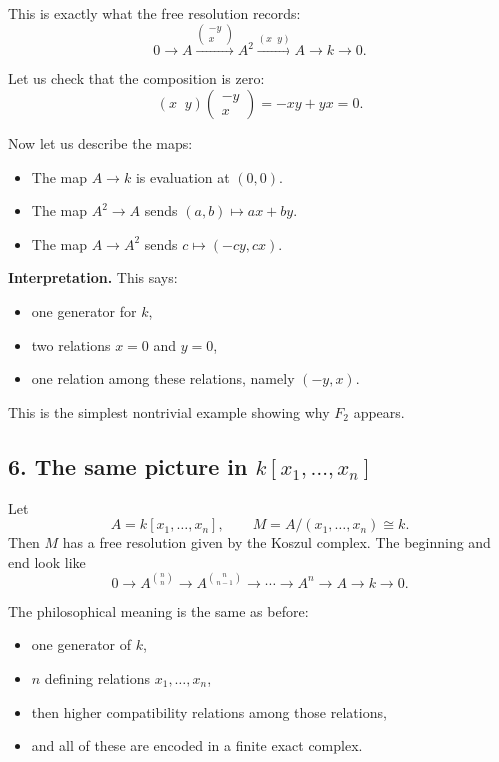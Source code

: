 \documentclass[12pt,a4paper]{article}
\theoremstyle{notespace}
\theoremstyle{definition}
\begin{document}
This is exactly what the free resolution records:
\[
0 \longrightarrow A \xrightarrow{\begin{pmatrix}-y\\x\end{pmatrix}} A^2
\xrightarrow{(x\;\;y)} A \longrightarrow k \longrightarrow 0.
\]

Let us check that the composition is zero:
\[
(x\;\;y)\begin{pmatrix}-y\\x\end{pmatrix} = -xy+yx=0.
\]

Now let us describe the maps:

\begin{itemize}
	\item The map \(A \to k\) is evaluation at \((0,0)\).
	\item The map \(A^2 \to A\) sends \((a,b)\mapsto ax+by\).
	\item The map \(A \to A^2\) sends \(c\mapsto (-cy,cx)\).
\end{itemize}

\textbf{Interpretation.}
This says:
\begin{itemize}
	\item one generator for \(k\),
	\item two relations \(x=0\) and \(y=0\),
	\item one relation among these relations, namely \((-y,x)\).
\end{itemize}

This is the simplest nontrivial example showing why \(F_2\) appears.

\subsection{6. The same picture in \(k[x_1,\dots,x_n]\)}

Let
\[
A=k[x_1,\dots,x_n], \qquad M=A/(x_1,\dots,x_n)\cong k.
\]
Then \(M\) has a free resolution given by the Koszul complex. The beginning and end look like
\[
0 \longrightarrow A^{\binom{n}{n}} \longrightarrow A^{\binom{n}{n-1}}
\longrightarrow \cdots \longrightarrow A^n \longrightarrow A \longrightarrow k \longrightarrow 0.
\]

The philosophical meaning is the same as before:
\begin{itemize}
	\item one generator of \(k\),
	\item \(n\) defining relations \(x_1,\dots,x_n\),
	\item then higher compatibility relations among those relations,
	\item and all of these are encoded in a finite exact complex.
\end{itemize}
\end{document}
